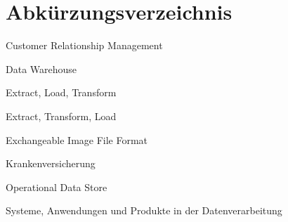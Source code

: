 \chapter*{Abkürzungsverzeichnis}

\begin{description}[leftmargin=3.4cm,style=nextline]
  \item[CRM] Customer Relationship Management
  \item[DWH] Data Warehouse
  \item[ELT] Extract, Load, Transform
  \item[ETL] Extract, Transform, Load
  \item[EXIF] Exchangeable Image File Format
  \item[KV] Krankenversicherung
  \item[ODS] Operational Data Store
  \item[SAP] Systeme, Anwendungen und Produkte in der Datenverarbeitung
\end{description}
